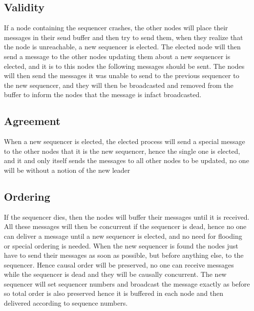 \documentclass{article}
\begin{document}
  \subsection{Validity}
    If a node containing the sequencer crashes, the other nodes will place their messages in their
    send buffer and then try to send them, when they realize that the node is unreachable, a new 
    sequencer is elected. The elected node will then send a message to the other nodes updating them
    about a new sequencer is elected, and it is to this nodes the following messages should be sent.
    The nodes will then send the messages it was unable to send to the previous sequencer to the
    new sequencer, and they will then be broadcasted and removed from the buffer to inform the nodes
    that the message is infact broadcasted.

  \subsection{Agreement}
    When a new sequencer is elected, the elected process will send a special message to the other nodes
    that it is the new sequencer, hence the single one is elected, and it and only itself sends the 
    messages to all other nodes to be updated, no one will be without a notion of the new leader

  \subsection{Ordering}
    If the sequencer dies, then the nodes will buffer their messages until it is received. 
    All these messages will then be concurrent if the sequencer is dead, hence no one can 
    deliver a message until a new sequencer is elected, and no need for flooding or special
    ordering is needed. When the new sequencer is found the nodes just have to send their messages as soon
    as possible, but before anything else, to the sequencer. Hence causal order will be preserved, no one
    can receive messages while the sequencer is dead and they will be causally concurrent. The new sequencer
    will set sequencer numbers and broadcast the message exactly as before so total order is also preserved
    hence it is buffered in each node and then delivered according to sequence numbers.
    
\end{document}

